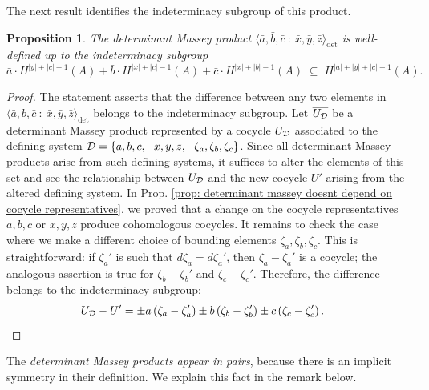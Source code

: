 \documentclass[11pt]{article}
\newtheorem{proposition}[theorem]{Proposition}
\theoremstyle{definition}
\theoremstyle{definition}
\begin{document}
The next result identifies the indeterminacy subgroup of this product.


\begin{proposition}
\label{prop: indeterminacy subgroup}
The determinant Massey product $\langle \bar a,\bar b,\bar c \ :\ \bar x, \bar y, \bar z\rangle_{\det}$ is well-defined up to the 
indeterminacy subgroup
\begin{equation*}
\bar a\cdot H^{|y|+|c|-1}\left(A\right) + \bar b\cdot H^{|x|+|c|-1}\left(A\right)+ \bar c \cdot H^{|x|+|b|-1}\left(A\right)\;\subseteq\; H^{|a|+|y|+|c|-1}\left(A\right).
\end{equation*}
\end{proposition}

\begin{proof}
The statement asserts that the difference between any two elements in  $\langle \bar a,\bar b,\bar c \ :\ \bar x, \bar y, \bar z\rangle_{\det}$
belongs to the indeterminacy subgroup. 
Let $\overline{U_\mathcal D}$ be a determinant Massey product
represented by a cocycle $U_\mathcal D$ associated to the defining system 
$\mD = \left\{a,b,c,\ \ x,y,z,\ \ \zeta_a,\zeta_b,\zeta_c\right\}$.
Since all determinant Massey products arise from such defining systems,
it suffices to alter the elements of this set and see the relationship between $U_\mathcal D$ and the 
new cocycle $U'$ arising from the altered defining system. 
In Prop. \ref{prop: determinant massey doesnt depend on cocycle representatives},
we proved that a change on the cocycle representatives $a,b,c$ or $x,y,z$ produce cohomologous cocycles.
It remains to check the case where we make a different choice of bounding elements 
$\zeta_a,\zeta_b,\zeta_c$.
This is straightforward: if $\zeta_a'$ is such that $d\zeta_a = d\zeta_a'$, then $\zeta_a-\zeta_a'$ is a 
cocycle; the analogous assertion is true for $\zeta_b-\zeta_b'$ and $\zeta_c-\zeta_c'$.
Therefore, the difference belongs to the indeterminacy subgroup:
\begin{align*}
    U_\mathcal D-U' &= \pm a\left(\zeta_a-\zeta_a'\right) \pm b\left(\zeta_b-\zeta_b'\right) \pm c\left(\zeta_c-\zeta_c'\right).
\end{align*}
\end{proof}


The \emph{determinant Massey products appear in pairs},
because there is an implicit symmetry in their definition.
We explain this fact in the remark below.
\end{document}
